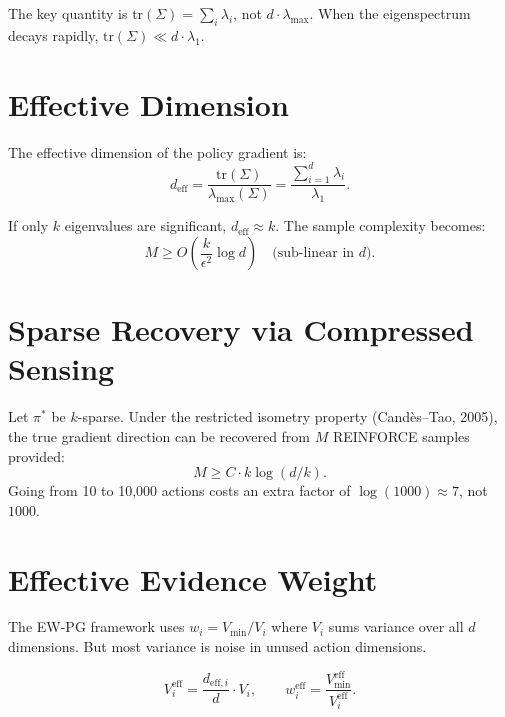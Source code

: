 The key quantity is $\text{tr}(\Sigma) = \sum_i \lambda_i$, not $d \cdot \lambda_{\max}$. When the eigenspectrum decays rapidly, $\text{tr}(\Sigma) \ll d \cdot \lambda_1$.


\section{Effective Dimension}

\begin{definition}\label{def:deff}
The effective dimension of the policy gradient is:
\begin{equation}
    d_{\text{eff}} = \frac{\text{tr}(\Sigma)}{\lambda_{\max}(\Sigma)} = \frac{\sum_{i=1}^d \lambda_i}{\lambda_1}.
\end{equation}
\end{definition}

If only $k$ eigenvalues are significant, $d_{\text{eff}} \approx k$. The sample complexity becomes:
\begin{equation}
    M \geq O\!\left(\frac{k}{\epsilon^2} \log d\right)
    \quad \text{(sub-linear in $d$)}.
\end{equation}


\section{Sparse Recovery via Compressed Sensing}

\begin{theorem}\label{thm:sparse-recovery}
Let $\pi^*$ be $k$-sparse. Under the restricted isometry property (Cand\`es--Tao, 2005), the true gradient direction can be recovered from $M$ REINFORCE samples provided:
\begin{equation}
    M \geq C \cdot k \log(d/k).
\end{equation}
Going from 10 to 10,000 actions costs an extra factor of $\log(1000) \approx 7$, not $1000$.
\end{theorem}


\section{Effective Evidence Weight}

The EW-PG framework uses $w_i = V_{\min}/V_i$ where $V_i$ sums variance over all $d$ dimensions. But most variance is noise in unused action dimensions.

\begin{definition}
\begin{equation}
    V_i^{\text{eff}} = \frac{d_{\text{eff},i}}{d} \cdot V_i, \qquad
    w_i^{\text{eff}} = \frac{V_{\min}^{\text{eff}}}{V_i^{\text{eff}}}.
\end{equation}
\end{definition}

